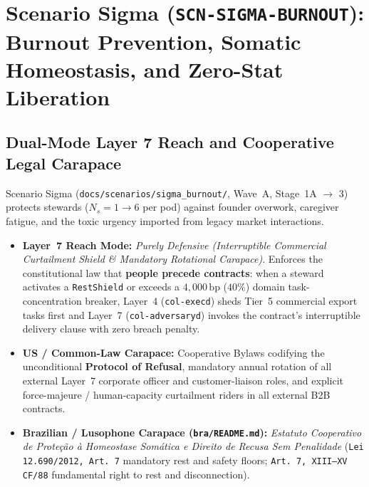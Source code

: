 \chapter{Scenario Sigma (\texttt{SCN-SIGMA-BURNOUT}): Burnout Prevention, Somatic Homeostasis, and Zero-Stat Liberation}
\label{app:scenario-sigma}

\section{Dual-Mode Layer 7 Reach and Cooperative Legal Carapace}
Scenario Sigma (\texttt{docs/scenarios/sigma\_burnout/}, Wave~A, Stage~1A $\to$ 3) protects stewards ($N_s = 1 \to 6$ per pod) against founder overwork, caregiver fatigue, and the toxic urgency imported from legacy market interactions.
\begin{itemize}
    \item \textbf{Layer~7 Reach Mode:} \textit{Purely Defensive (Interruptible Commercial Curtailment Shield \& Mandatory Rotational Carapace)}. Enforces the constitutional law that \textbf{people precede contracts}: when a steward activates a \texttt{RestShield} or exceeds a $4{,}000\,\mathrm{bp}$ ($40\%$) domain task-concentration breaker, Layer~4 (\texttt{col-execd}) sheds Tier~5 commercial export tasks first and Layer~7 (\texttt{col-adversaryd}) invokes the contract's interruptible delivery clause with zero breach penalty.
    \item \textbf{US / Common-Law Carapace:} Cooperative Bylaws codifying the unconditional \textbf{Protocol of Refusal}, mandatory annual rotation of all external Layer~7 corporate officer and customer-liaison roles, and explicit force-majeure / human-capacity curtailment riders in all external B2B contracts.
    \item \textbf{Brazilian / Lusophone Carapace (\texttt{bra/README.md}):} \textit{Estatuto Cooperativo de Prote{\c{c}}{\~a}o {\`a} Homeostase Som{\'a}tica e Direito de Recusa Sem Penalidade} (\texttt{Lei 12.690/2012, Art.~7{\textordmasculine}} mandatory rest and safety floors; \texttt{Art.~7{\textordmasculine}, XIII--XV CF/88} fundamental right to rest and disconnection).
\end{itemize}


